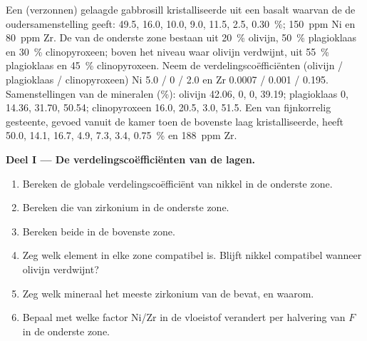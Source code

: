 \begin{problem}
\label{pb:b2:magmatic-differentiation:1}
Een (verzonnen) gelaagde gabbrosill kristalliseerde uit een basalt waarvan de 
de oudersamenstelling geeft:  49.5,  16.0,  10.0,
 9.0,  11.5,  2.5,  \qty{0.30}{\percent};
\qty{150}{ppm} Ni en \qty{80}{ppm} Zr. De  van de onderste zone bestaan uit
\qty{20}{\percent} olivijn, \qty{50}{\percent} plagioklaas en \qty{30}{\percent}
clinopyroxeen; boven het niveau waar olivijn verdwijnt, uit \qty{55}{\percent}
plagioklaas en \qty{45}{\percent} clinopyroxeen. Neem de verdelingscoëfficiënten
(olivijn / plagioklaas / clinopyroxeen) Ni 5.0 / 0 / 2.0 en Zr 0.0007 / 0.001 /
0.195. Samenstellingen van de mineralen (\unit{\percent}): olivijn  42.06,  0,
 0,  39.19; plagioklaas 0, 14.36, 31.70, 50.54; clinopyroxeen
16.0, 20.5, 3.0, 51.5. Een 
van fijnkorrelig gesteente, gevoed vanuit de kamer toen de bovenste laag kristalliseerde, heeft
 50.0,  14.1,  16.7,  4.9,  7.3,
 3.4,  \qty{0.75}{\percent} en \qty{188}{ppm} Zr.

\noindent\textbf{Deel I --- De verdelingscoëfficiënten van de lagen.}
\begin{enumerate}
\item Bereken de globale verdelingscoëfficiënt van nikkel in de onderste zone.
\item Bereken die van zirkonium in de onderste zone.
\item Bereken beide in de bovenste zone.
\item Zeg welk element in elke zone compatibel is. Blijft nikkel compatibel wanneer
olivijn verdwijnt?
\item Zeg welk mineraal het meeste zirkonium van de  bevat, en waarom.
\item Bepaal met welke factor Ni/Zr in de vloeistof verandert per halvering van $F$ in de onderste
zone.
\end{enumerate}


\end{problem}
